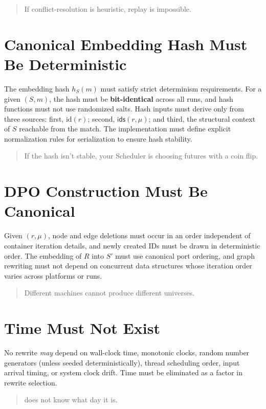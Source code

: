 \begin{quote}
If conflict-resolution is heuristic, replay is impossible.
\end{quote}

\section{Canonical Embedding Hash Must Be Deterministic}

The embedding hash $h_S(m)$ must satisfy strict determinism requirements. For a given $(S,m)$, the
hash must be \textbf{bit-identical} across all runs, and hash functions must not use randomized
salts. Hash inputs must derive only from three sources: first, $\mathrm{id}(r)$; second,
$\mathsf{ids}(r,\mu)$; and third, the structural context of $S$ reachable from the match. The
implementation must define explicit normalization rules for serialization to ensure hash stability.

\begin{quote}
If the hash isn't stable, your Scheduler is choosing futures with a coin flip.
\end{quote}

\section{DPO Construction Must Be Canonical}

Given $(r,\mu)$, node and edge deletions must occur in an order independent of container iteration
details, and newly created IDs must be drawn in deterministic order. The embedding of $R$ into $S'$
must use canonical port ordering, and graph rewriting must not depend on concurrent data structures
whose iteration order varies across platforms or runs.

\begin{quote}
Different machines cannot produce different universes.
\end{quote}

\section{Time Must Not Exist}

No rewrite \emph{may} depend on wall-clock time, monotonic clocks, random number generators (unless
seeded deterministically), thread scheduling order, input arrival timing, or system clock drift. Time
must be eliminated as a factor in rewrite selection.

\begin{quote}
\COMPUTER{} does not know what day it is.
\end{quote}

